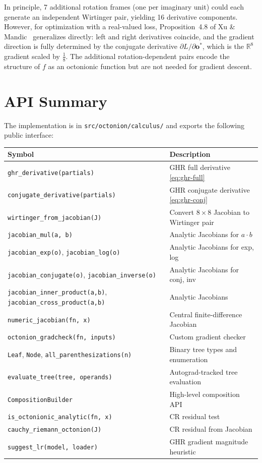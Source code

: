 \documentclass[11pt]{article}
\newcommand{\RR}{\mathbb{R}}
\begin{document}
In principle, 7 additional rotation frames (one per imaginary unit) could
each generate an independent Wirtinger pair, yielding 16 derivative components.
However, for optimization with a real-valued loss, Proposition~4.8 of
Xu \& Mandic~\cite{xu2015ghr} generalizes directly: left and right derivatives
coincide, and the gradient direction is fully determined by the conjugate
derivative $\partial L/\partial\mathbf{o}^*$, which is the $\RR^8$ gradient
scaled by $\tfrac{1}{8}$.  The additional rotation-dependent pairs encode
the structure of $f$ as an octonionic function but are not needed for
gradient descent.

\section{API Summary}

The implementation is in \texttt{src/octonion/calculus/} and exports the
following public interface:

\begin{center}
\begin{tabular}{ll}
  \toprule
  Symbol & Description \\
  \midrule
  \texttt{ghr\_derivative(partials)} & GHR full derivative \eqref{eq:ghr-full} \\
  \texttt{conjugate\_derivative(partials)} & GHR conjugate derivative \eqref{eq:ghr-conj} \\
  \texttt{wirtinger\_from\_jacobian(J)} & Convert $8\times 8$ Jacobian to Wirtinger pair \\
  \texttt{jacobian\_mul(a, b)} & Analytic Jacobians for $a \cdot b$ \\
  \texttt{jacobian\_exp(o)}, \texttt{jacobian\_log(o)} & Analytic Jacobians for exp, log \\
  \texttt{jacobian\_conjugate(o)}, \texttt{jacobian\_inverse(o)} & Analytic Jacobians for conj, inv \\
  \texttt{jacobian\_inner\_product(a,b)}, \texttt{jacobian\_cross\_product(a,b)} & Analytic Jacobians \\
  \texttt{numeric\_jacobian(fn, x)} & Central finite-difference Jacobian \\
  \texttt{octonion\_gradcheck(fn, inputs)} & Custom gradient checker \\
  \texttt{Leaf}, \texttt{Node}, \texttt{all\_parenthesizations(n)} & Binary tree types and enumeration \\
  \texttt{evaluate\_tree(tree, operands)} & Autograd-tracked tree evaluation \\
  \texttt{CompositionBuilder} & High-level composition API \\
  \texttt{is\_octonionic\_analytic(fn, x)} & CR residual test \\
  \texttt{cauchy\_riemann\_octonion(J)} & CR residual from Jacobian \\
  \texttt{suggest\_lr(model, loader)} & GHR gradient magnitude heuristic \\
  \bottomrule
\end{tabular}
\end{center}
\end{document}
